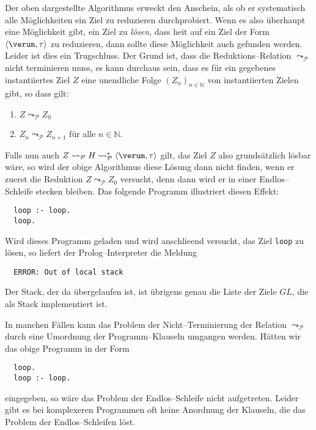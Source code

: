 Der oben dargestellte Algorithmus erweckt den Anschein, als ob er systematisch alle
M\"{o}glichkeiten ein Ziel zu reduzieren durchprobiert.  Wenn es also \"{u}berhaupt eine
M\"{o}glichkeit gibt, ein Ziel zu \emph{l\"{o}sen}, dass hei\3t auf ein Ziel der Form 
 $\langle \verum, \tau \rangle$ zu reduzieren, dann sollte diese M\"{o}glichkeit auch gefunden
 werden.  Leider ist dies ein Trugschluss.  Der Grund ist, dass die Reduktions--Relation
$\leadsto_\mathcal{P}$ nicht terminieren muss, es kann durchaus sein, dass es f\"{u}r ein
gegebenes instantiiertes Ziel $Z$ eine unendliche Folge $(Z_n)_{n\in \mathbb{N}}$ von instantiierten Zielen gibt, so
dass gilt:
\begin{enumerate}
\item $Z \leadsto_\mathcal{P} Z_0$
\item $Z_n \leadsto_\mathcal{P} Z_{n+1}$ \quad f\"{u}r alle $n\in\mathbb{N}$.
\end{enumerate}
Falls nun auch $Z \leadsto_\mathcal{P} H \leadsto_\mathcal{P}^* \langle \verum, \tau \rangle$ gilt, 
das Ziel $Z$ also grunds\"{a}tzlich l\"{o}sbar w\"{a}re, so wird der obige Algorithmus diese L\"{o}sung
dann nicht finden, wenn er zuerst die Reduktion $Z \leadsto_\mathcal{P} Z_0$ versucht, denn
dann wird er in einer Endlos--Schleife stecken bleiben.  Das folgende Programm illustriert
diesen Effekt:
\begin{verbatim}
  loop :- loop.
  loop.
\end{verbatim}
Wird dieses Programm geladen und wird anschlie\3end versucht, das Ziel \texttt{loop} zu
l\"{o}sen, so liefert der Prolog--Interpreter die Meldung
\begin{verbatim}
  ERROR: Out of local stack
\end{verbatim}
Der Stack, der da \"{u}bergelaufen ist, ist \"{u}brigens genau die Liste der Ziele $G\!L$, die als Stack
implementiert ist.

In manchen F\"{a}llen kann  das Problem der Nicht--Terminierung der Relation
$\leadsto_\mathcal{P}$ durch eine Umordnung der Programm--Klauseln umgangen werden.
H\"{a}tten wir das obige Programm in  der Form
\begin{verbatim}
  loop.
  loop :- loop.
\end{verbatim}
eingegeben, so w\"{a}re das Problem der Endlos--Schleife nicht aufgetreten.  Leider gibt es bei
komplexeren Programmen oft keine Anordnung der Klauseln, die das Problem der
Endlos--Schleifen l\"{o}st.  

